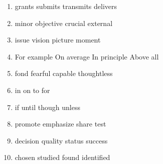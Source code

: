 \begin{enumerate}
	\item


\fourchoices
{grants}
{submits}
{transmits}
{delivers}




\item


\fourchoices
{minor}
{objective}
{crucial}
{external}




\item


\fourchoices
{issue}
{vision}
{picture}
{moment}




\item


\fourchoices
{For example}
{On average}
{In principle}
{Above all}





\item


\fourchoices
{fond}
{fearful}
{capable}
{thoughtless}




\item


\fourchoices
{in}
{on}
{to}
{for}






\item


\fourchoices
{if}
{until}
{though}
{unless}




\item


\fourchoices
{promote}
{emphasize}
{share}
{test}




\item


\fourchoices
{decision}
{quality}
{status}
{success}




\item


\fourchoices
{chosen}
{studied}
{found}
{identified}





\end{enumerate}
